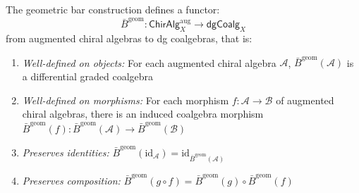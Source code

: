 \begin{theorem}\label{thm:bar-functorial-complete}
\label{thm:bar-functorial}
The geometric bar construction defines a functor:
\[\bar{B}^{\text{geom}}: \mathsf{ChirAlg}_X^{\mathrm{aug}} \to \mathsf{dgCoalg}_X\]
from augmented chiral algebras to dg coalgebras, that is:
\begin{enumerate}
\item \emph{Well-defined on objects:} For each augmented chiral algebra $\mathcal{A}$, $\bar{B}^{\text{geom}}(\mathcal{A})$ is a differential graded coalgebra
\item \emph{Well-defined on morphisms:} For each morphism $f: \mathcal{A} \to \mathcal{B}$ of augmented chiral algebras, there is an induced coalgebra morphism $\bar{B}^{\text{geom}}(f): \bar{B}^{\text{geom}}(\mathcal{A}) \to \bar{B}^{\text{geom}}(\mathcal{B})$
\item \emph{Preserves identities:} $\bar{B}^{\text{geom}}(\text{id}_\mathcal{A}) = \text{id}_{\bar{B}^{\text{geom}}(\mathcal{A})}$
\item \emph{Preserves composition:} $\bar{B}^{\text{geom}}(g \circ f) = \bar{B}^{\text{geom}}(g) \circ \bar{B}^{\text{geom}}(f)$
\end{enumerate}
\end{theorem}

